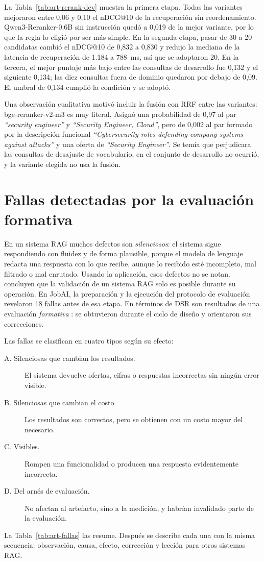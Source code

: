 La Tabla~\ref{tab:art-rerank-dev} muestra la primera etapa. Todas las variantes mejoraron entre 0,06 y 0,10 el nDCG@10 de la recuperación sin reordenamiento. Qwen3-Reranker-0.6B sin instrucción quedó a 0,019 de la mejor variante, por lo que la regla lo eligió por ser más simple. En la segunda etapa, pasar de 30 a 20 candidatas cambió el nDCG@10 de 0,832 a 0,830 y redujo la mediana de la latencia de recuperación de 1.184 a 788~ms, así que se adoptaron 20. En la tercera, el mejor puntaje más bajo entre las consultas de desarrollo fue 0,132 y el siguiente 0,134; las diez consultas fuera de dominio quedaron por debajo de 0,09. El umbral de 0,134 cumplió la condición y se adoptó.

Una observación cualitativa motivó incluir la fusión con RRF entre las variantes: bge-reranker-v2-m3 es muy literal. Asignó una probabilidad de 0,97 al par \textit{\enquote{security engineer}} y \textit{\enquote{Security Engineer, Cloud}}, pero de 0,002 al par formado por la descripción funcional \textit{\enquote{Cybersecurity roles defending company systems against attacks}} y una oferta de \textit{\enquote{Security Engineer}}. Se temía que perjudicara las consultas de desajuste de vocabulario; en el conjunto de desarrollo no ocurrió, y la variante elegida no usa la fusión.

\section{Fallas detectadas por la evaluación formativa}
\label{sec:art-fallas}

En un sistema RAG muchos defectos son \emph{silenciosos}: el sistema sigue respondiendo con fluidez y de forma plausible, porque el modelo de lenguaje redacta una respuesta con lo que recibe, aunque lo recibido esté incompleto, mal filtrado o mal enrutado. Usando la aplicación, esos defectos no se notan. \citet{Barnett2024} concluyen que la validación de un sistema RAG solo es posible durante su operación. En JobAI, la preparación y la ejecución del protocolo de evaluación revelaron 18 fallas antes de esa etapa. En términos de DSR son resultados de una evaluación \emph{formativa} \citep{Venable2016}: se obtuvieron durante el ciclo de diseño y orientaron sus correcciones.

Las fallas se clasifican en cuatro tipos según su efecto:
\begin{description}
    \item[A. Silenciosas que cambian los resultados.] El sistema devuelve ofertas, cifras o respuestas incorrectas sin ningún error visible.
    \item[B. Silenciosas que cambian el costo.] Los resultados son correctos, pero se obtienen con un costo mayor del necesario.
    \item[C. Visibles.] Rompen una funcionalidad o producen una respuesta evidentemente incorrecta.
    \item[D. Del arnés de evaluación.] No afectan al artefacto, sino a la medición, y habrían invalidado parte de la evaluación.
\end{description}
La Tabla~\ref{tab:art-fallas} las resume. Después se describe cada una con la misma secuencia: observación, causa, efecto, corrección y lección para otros sistemas RAG.

